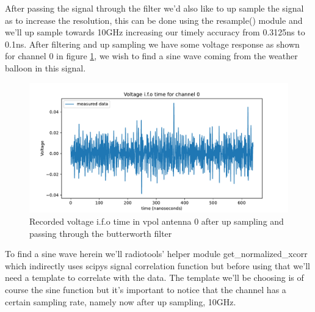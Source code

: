 After passing the signal through the filter we'd also like to up sample the
signal as to increase the resolution, this can be done using the resample()
module and we'll up sample towards 10GHz increasing our timely accuracy from
0.3125ns to 0.1ns.  After filtering and up sampling we have some voltage
response as shown for channel 0 in figure \ref{fig:VoltageAfterFilter}, we wish
to find a sine wave coming from the weather balloon in this signal.

\begin{figure}
	\centering
	\includegraphics[width=\textwidth]{figures/VoltageAfterFilter.pdf}
	\caption{Recorded voltage i.f.o time in vpol antenna 0 after up sampling and passing through the butterworth filter}
	\label{fig:VoltageAfterFilter}
\end{figure}

To find a sine wave herein we'll radiotools' helper module get\_normalized\_xcorr
which indirectly uses scipys signal correlation function but before using that we'll
need a template to correlate with the data. The template we'll be choosing is
of course the sine function but it's important to notice that the channel has a
certain sampling rate, namely now after up sampling, 10GHz. 

